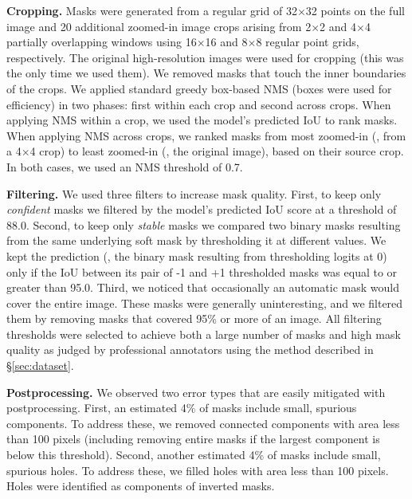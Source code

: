 \documentclass[10pt,twocolumn,letterpaper]{article}
\renewcommand{\paragraph}[1]{\vspace{1.25mm}\noindent\textbf{#1}}
\newcommand{\x}{{\times}}
\begin{document}
\paragraph{Cropping.} Masks were generated from a regular grid of 32$\x$32 points on the full image and 20 additional zoomed-in image crops arising from 2$\x$2 and 4$\x$4 partially overlapping windows using 16$\x$16 and 8$\x$8 regular point grids, respectively. The original high-resolution images were used for cropping (this was the only time we used them). We removed masks that touch the inner boundaries of the crops. We applied standard greedy box-based NMS (boxes were used for efficiency) in two phases: first within each crop and second across crops. When applying NMS within a crop, we used the model's predicted IoU to rank masks. When applying NMS across crops, we ranked masks from most zoomed-in (\ie, from a 4$\x$4 crop) to least zoomed-in (\ie, the original image), based on their source crop. In both cases, we used an NMS threshold of 0.7.

\paragraph{Filtering.} We used three filters to increase mask quality. First, to keep only \emph{confident} masks we filtered by the model's predicted IoU score at a threshold of 88.0. Second, to keep only \emph{stable} masks we compared two binary masks resulting from the same underlying soft mask by thresholding it at different values. We kept the prediction (\ie, the binary mask resulting from thresholding logits at 0) only if the IoU between its pair of -1 and +1 thresholded masks was equal to or greater than 95.0. Third, we noticed that occasionally an automatic mask would cover the entire image. These masks were generally uninteresting, and we filtered them by removing masks that covered 95\% or more of an image. All filtering thresholds were selected to achieve both a large number of masks and high mask quality as judged by professional annotators using the method described in \S\ref{sec:dataset}.

\paragraph{Postprocessing.} We observed two error types that are easily mitigated with postprocessing. First, an estimated 4\% of masks include small, spurious components. To address these, we removed connected components with area less than 100 pixels (including removing entire masks if the largest component is below this threshold). Second, another estimated 4\% of masks include small, spurious holes. To address these, we filled holes with area less than 100 pixels. Holes were identified as components of inverted masks.
\end{document}
